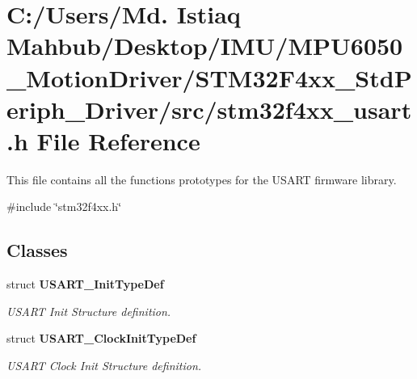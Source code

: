 \section{C\+:/\+Users/\+Md. Istiaq Mahbub/\+Desktop/\+I\+M\+U/\+M\+P\+U6050\+\_\+\+Motion\+Driver/\+S\+T\+M32\+F4xx\+\_\+\+Std\+Periph\+\_\+\+Driver/src/stm32f4xx\+\_\+usart.h File Reference}
\label{stm32f4xx__usart_8h}


This file contains all the functions prototypes for the U\+S\+A\+RT firmware library.  


{\ttfamily \#include \char`\"{}stm32f4xx.\+h\char`\"{}}\newline
\subsection*{Classes}
\begin{DoxyCompactItemize}
\item 
struct \textbf{ U\+S\+A\+R\+T\+\_\+\+Init\+Type\+Def}
\begin{DoxyCompactList}\small\item\em U\+S\+A\+RT Init Structure definition. \end{DoxyCompactList}\item 
struct \textbf{ U\+S\+A\+R\+T\+\_\+\+Clock\+Init\+Type\+Def}
\begin{DoxyCompactList}\small\item\em U\+S\+A\+RT Clock Init Structure definition. \end{DoxyCompactList}\end{DoxyCompactItemize}
